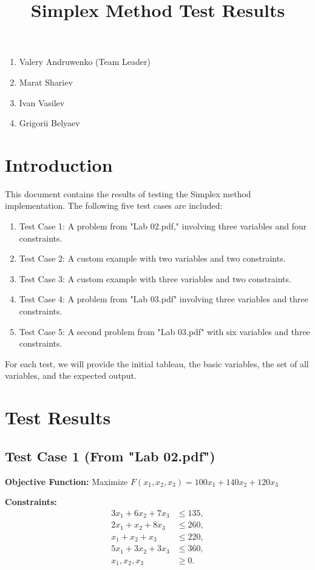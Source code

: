 \documentclass{article}
\title{Simplex Method Test Results}
\author{}
\date{}
\begin{document}
\maketitle

\begin{enumerate}
    \item Valery Andruwenko (Team Leader)
    \item Marat Shariev
    \item Ivan Vasilev
    \item Grigorii Belyaev
\end{enumerate}

\section*{Introduction}

This document contains the results of testing the Simplex method implementation. The following five test cases are included:
\begin{enumerate}
    \item Test Case 1: A problem from "Lab 02.pdf," involving three variables and four constraints.
    \item Test Case 2: A custom example with two variables and two constraints.
    \item Test Case 3: A custom example with three variables and two constraints.
    \item Test Case 4: A problem from "Lab 03.pdf" involving three variables and three constraints.
    \item Test Case 5: A second problem from "Lab 03.pdf" with six variables and three constraints.
\end{enumerate}

For each test, we will provide the initial tableau, the basic variables, the set of all variables, and the expected output.

\section*{Test Results}

\subsection*{Test Case 1 (From "Lab 02.pdf")}

\textbf{Objective Function:} Maximize \( F(x_1, x_2, x_3) = 100x_1 + 140x_2 + 120x_3 \)

\textbf{Constraints:}
\[
\begin{aligned}
3x_1 + 6x_2 + 7x_3 &\leq 135, \\
2x_1 + x_2 + 8x_3 &\leq 260, \\
x_1 + x_2 + x_3 &\leq 220, \\
5x_1 + 3x_2 + 3x_3 &\leq 360, \\
x_1, x_2, x_3 &\geq 0.
\end{aligned}
\]
\end{document}
